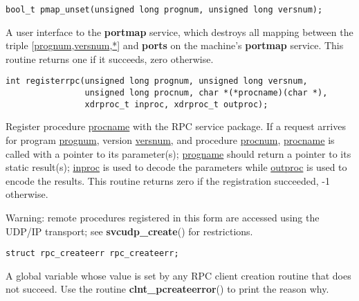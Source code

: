 \documentclass[]{article}
\let\realtextbf=\textbf
\renewcommand{\textbf}[1]{\textcolor{boldcolor}{\realtextbf{#1}}}
\renewcommand{\emph}[1]{\underline{#1}}
\begin{document}
\begin{verbatim}
bool_t pmap_unset(unsigned long prognum, unsigned long versnum);
\end{verbatim}

\begin{description}
\itemsep1pt\parskip0pt
\item[]
A user interface to the \textbf{portmap} service, which destroys all
mapping between the triple {[}\emph{prognum},\emph{versnum},\emph{*}{]}
and \textbf{ports} on the machine's \textbf{portmap} service. This
routine returns one if it succeeds, zero otherwise.
\end{description}

\begin{verbatim}
int registerrpc(unsigned long prognum, unsigned long versnum,
                unsigned long procnum, char *(*procname)(char *),
                xdrproc_t inproc, xdrproc_t outproc);
\end{verbatim}

\begin{description}
\itemsep1pt\parskip0pt
\item[]
Register procedure \emph{procname} with the RPC service package. If a
request arrives for program \emph{prognum}, version \emph{versnum}, and
procedure \emph{procnum}, \emph{procname} is called with a pointer to
its parameter(s); \emph{progname} should return a pointer to its static
result(s); \emph{inproc} is used to decode the parameters while
\emph{outproc} is used to encode the results. This routine returns zero
if the registration succeeded, -1 otherwise.
\end{description}

\begin{description}
\itemsep1pt\parskip0pt
\item[]
Warning: remote procedures registered in this form are accessed using
the UDP/IP transport; see \textbf{svcudp\_create}() for restrictions.
\end{description}

\begin{verbatim}
struct rpc_createerr rpc_createerr;
\end{verbatim}

\begin{description}
\itemsep1pt\parskip0pt
\item[]
A global variable whose value is set by any RPC client creation routine
that does not succeed. Use the routine \textbf{clnt\_pcreateerror}() to
print the reason why.
\end{description}
\end{document}

